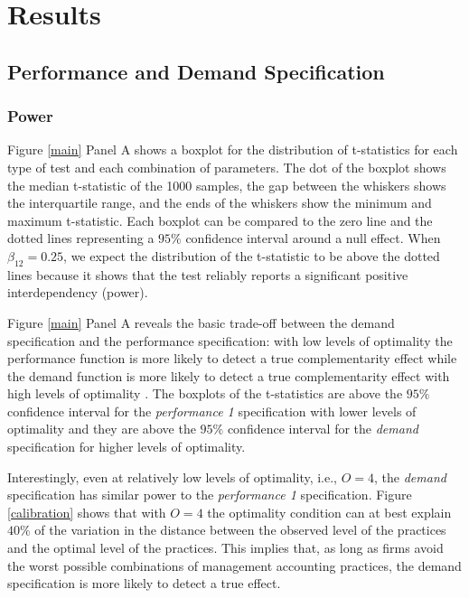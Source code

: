 \documentclass[12pt]{article}
\begin{document}
\section{Results}
\subsection{Performance and Demand Specification}\label{performance-and-demand-function-approach}


\subsubsection{Power}\label{Power}
Figure \ref{main} Panel A shows a boxplot for the distribution of t-statistics for each type of test and each combination of parameters. The dot of the boxplot shows the median t-statistic of the 1000 samples, the gap between the whiskers shows the interquartile range, and the ends of the whiskers show the minimum and maximum t-statistic. Each boxplot can be compared to the zero line and the dotted lines representing a $95\%$ confidence interval around a null effect. When $\beta_{12} = 0.25$, we expect the distribution of the t-statistic to be above the dotted lines because it shows that the test reliably reports a significant positive interdependency (power).  

Figure \ref{main} Panel A reveals the basic trade-off between the demand specification and the performance specification: with low levels of optimality the performance function is more likely to detect a true complementarity effect while the demand function is more likely to detect a true complementarity effect with high levels of optimality \citep{grabner_management_2013, aral_three-way_2012, johansson_testing_2018}. The boxplots of the t-statistics are above the $95\%$ confidence interval for the \emph{performance 1} specification with lower levels of optimality and they are above the $95\%$ confidence interval for the \emph{demand} specification for higher levels of optimality.

Interestingly, even at relatively low levels of optimality, i.e., $O = 4$, the \emph{demand} specification has similar power to the \emph{performance 1} specification. Figure \ref{calibration} shows that with $O=4$ the optimality condition can at best explain $40\%$ of the variation in the distance between the observed level of the practices and the optimal level of the practices. This implies that, as long as firms avoid the worst possible combinations of management accounting practices, the demand specification is more likely to detect a true effect.
\end{document}
